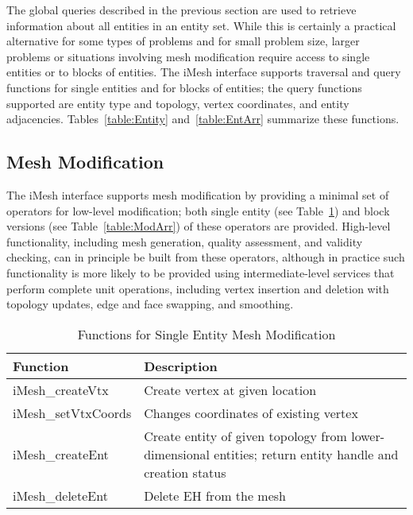 The global queries described in the previous section are used to retrieve
information about all entities in an entity set. While this is certainly
a practical alternative for some types of problems and for small problem
size, larger problems or situations involving mesh modification require
access to single entities or to blocks of entities. The iMesh interface
supports traversal and query functions for single entities and for
blocks of entities; the query functions supported are entity type
and topology, vertex coordinates, and entity adjacencies. Tables~\ref{table:Entity}
and~\ref{table:EntArr} summarize these functions.


\subsection{Mesh Modification\label{sub:Mesh-Modification}}

The iMesh interface supports mesh modification by providing a minimal
set of operators for low-level modification; both single entity (see
Table~\ref{table:Modify}) and block versions (see Table~\ref{table:ModArr})
of these operators are provided. High-level functionality, including
mesh generation, quality assessment, and validity checking, can in
principle be built from these operators, although in practice such
functionality is more likely to be provided using intermediate-level
services that perform complete unit operations, including vertex insertion
and deletion with topology updates, edge and face swapping, and smoothing.

%
\begin{table}

\caption{Functions for Single Entity Mesh Modification}

\label{table:Modify} \begin{tabular}{|p{1.25in}|p{223pt}|}
\hline 
{\small Function}&
{\small Description}\tabularnewline
\hline
\hline 
{\small iMesh\_createVtx}&
{\small Create vertex at given location}\tabularnewline
\hline 
{\small iMesh\_setVtxCoords}&
{\small Changes coordinates of existing vertex}\tabularnewline
\hline 
{\small iMesh\_createEnt}&
{\small Create entity of given topology from lower-dimensional entities;
return entity handle and creation status}\tabularnewline
\hline 
{\small iMesh\_deleteEnt}&
{\small Delete EH from the mesh}\tabularnewline
\hline
\end{tabular}
\end{table}


